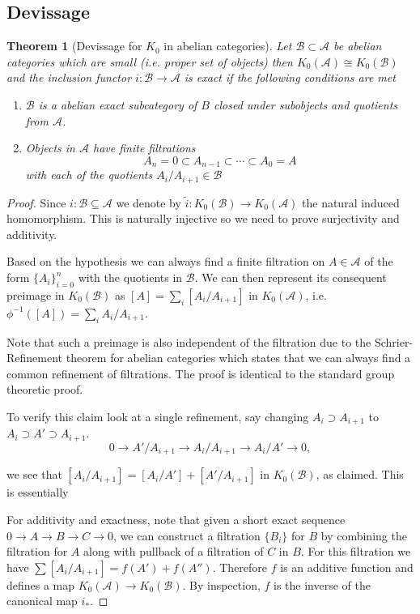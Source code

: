 \documentclass[12pt]{article}
\numberwithin{equation}{section}
\newcounter{dummy} \numberwithin{dummy}{section}
\newtheorem{theorem}[dummy]{Theorem}
\begin{document}
	\subsection{Devissage}
	\begin{theorem}[Devissage for $K_0$ in abelian categories]\label{devissagek0}
		Let $\mathcal B \subset \mathcal A$ be abelian categories which are small (i.e. proper set of objects) then $K_0(\mathcal A) \cong K_0(\mathcal B)$ and the inclusion functor $i:\mathcal{B} \to \mathcal{A}$ is exact if the following conditions are met
		\begin{enumerate}
			\item $\mathcal B$ is a abelian exact subcategory of $B$ closed under subobjects and quotients from $\mathcal{A}$.
			\item Objects in $\mathcal{A}$ have finite filtrations \[ A_n=0 \subset A_{n-1} \subset \cdots \subset A_0 =A \] with each of the quotients $A_i/A_{i+1} \in \mathcal{B}$
		\end{enumerate}
	\end{theorem}
	\begin{proof}
		Since $i:\mathcal{B} \subseteq \mathcal{A} $ we denote by $ \tilde{i} : K_0(\mathcal{B}) \to K_0(\mathcal{A})$ the natural induced homomorphism. This is naturally injective so we need to prove surjectivity and additivity.
		
		Based on the hypothesis we can always find a finite filtration on $A \in \mathcal{A}$ of the form $\{A_i\}_{i=0}^n$ with the quotients in $\mathcal{B}$. We can then represent its consequent preimage in $K_0(\mathcal{B})$ as $[A] = \sum_i [A_i / A_{i+1}]$ in $ K_0(\mathcal{A} )$, i.e. $\phi^{-1}([A])=\sum_i A_i/A_{i+1}$.
			
		Note that such a preimage is also independent of the filtration due to the Schrier-Refinement theorem for abelian categories which states that we can always find a common refinement of filtrations. The proof is identical to the standard group theoretic proof.
			
		To verify this claim look at a single refinement, say changing $A_i \supset A_{i+1}$ to $A_i \supset A' \supset A_{i+1}$. 
		\[
		0 \to A' / A_{i+1} \to A_i / A_{i+1} \to A_i / A' \to 0,
		\]
		
		we see that $[A_i / A_{i+1}] = [A_i / A'] + [A' / A_{i+1}]$ in $K_0(\mathcal{B})$, as claimed. This is essentially 
		
		For additivity and exactness, note that given a short exact sequence $0 \to A \to B \to C \to 0$, we can construct a filtration $\{B_i\}$ for $B$ by combining the filtration for $A$ along with pullback of a filtration of $C$ in $B$. For this filtration we have $\sum [A_i / A_{i+1}] = f(A') + f(A'')$. Therefore $f$ is an additive function and defines a map $K_0(\mathcal{A}) \to K_0(\mathcal{B})$. By inspection, $f$ is the inverse of the canonical map $i_*$.
	\end{proof}
\end{document}
